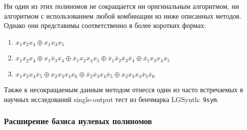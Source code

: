 \documentclass[a4paper,12pt,titlepage,finall]{article}
\begin{document}
Ни один из этих полиномов не сокращается ни оригинальным алгоритмом, ни алгоритмом с использованием любой комбинации из ниже описанных методов. Однако они представимы соответственно в более коротких формах:
\begin{enumerate}
    \item $ x_1 x_2 x_4 \oplus x_1 x_3 x_5 $
    \item $ x_1 x_2 x_4 \oplus x_1 \overline x_3 x_4 \oplus \overline x_1 x_2 x_4 x_5 \oplus \overline x_1 \overline x_2 \overline x_3 \overline x_4 \oplus \overline x_1 x_3 x_4 x_5 $
    \item $ x_1 x_2 x_4 \overline x_5 \oplus x_2 x_3 x_4 x_6 \oplus \overline x_2 \overline x_3 x_4 \overline x_5 \oplus x_2 x_3 x_4 \overline x_5 \overline x_6 $
\end{enumerate}

Также к несокращаемым данным методом отнесся один из часто встречаемых в научных исследований single-output тест из бенчмарка LGSynth: \texttt{9sym}.

\subsubsection{Расширение базиса нулевых полиномов}
\end{document}
